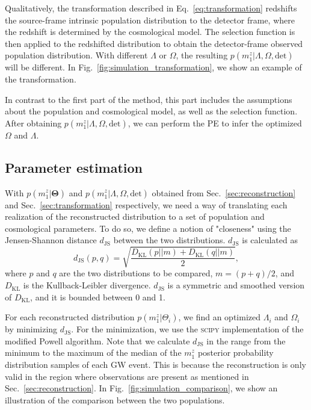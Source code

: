\documentclass[sn-aps, pdflatex]{sn-jnl}
\begin{document}
Qualitatively, the transformation described in Eq.~\eqref{eq:transformation} redshifts the source-frame intrinsic population distribution to the detector frame, where the redshift is determined by the cosmological model.
The selection function is then applied to the redshifted distribution to obtain the detector-frame observed population distribution.
With different $\Lambda$ or $\Omega$, the resulting $p(m^z_1|\Lambda, \Omega, \mathrm{det})$ will be different.
In Fig.~\ref{fig:simulation_transformation}, we show an example of the transformation.

In contrast to the first part of the method, this part includes the assumptions about the population and cosmological model, as well as the selection function.
After obtaining $p(m^z_1|\Lambda, \Omega, \mathrm{det})$, we can perform the \ac{PE} to infer the optimized $\Omega$ and $\Lambda$.

\subsection{Parameter estimation}
\label{sec:pe}

With $p(m^z_1|\mathbf{\Theta})$ and $p(m^z_1|\Lambda, \Omega, \mathrm{det})$ obtained from Sec.~\ref{sec:reconstruction} and Sec.~\ref{sec:transformation} respectively, we need a way of translating each realization of the reconstructed distribution to a set of population and cosmological parameters.
To do so, we define a notion of "closeness" using the Jensen-Shannon distance $d_\mathrm{JS}$ between the two distributions.
$d_\mathrm{JS}$ is calculated as
\begin{equation}
    d_\mathrm{JS}(p, q) = \sqrt{\frac{D_\mathrm{KL}(p||m) + D_\mathrm{KL}(q||m)}{2}},
\end{equation}
where $p$ and $q$ are the two distributions to be compared, $m = (p + q) / 2$, and $D_\mathrm{KL}$ is the Kullback-Leibler divergence.
$d_\mathrm{JS}$ is a symmetric and smoothed version of $D_\mathrm{KL}$, and it is bounded between 0 and 1.

For each reconstructed distribution $p(m^z_1|\Theta_i)$, we find an optimized $\Lambda_i$ and $\Omega_i$ by minimizing $d_\mathrm{JS}$.
For the minimization, we use the \textsc{scipy} \citep{2020SciPy-NMeth} implementation of the modified Powell algorithm.
Note that we calculate $d_\mathrm{JS}$ in the range from the minimum to the maximum of the median of the $m^z_1$ posterior probability distribution samples of each \ac{GW} event.
This is because the reconstruction is only valid in the region where observations are present as mentioned in Sec.~\ref{sec:reconstruction}.
In Fig.~\ref{fig:simulation_comparison}, we show an illustration of the comparison between the two populations.
\end{document}
